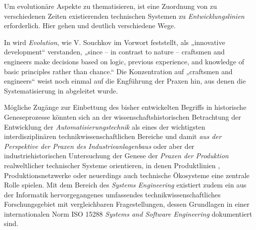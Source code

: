 \documentclass[11pt,a4paper]{article}
\begin{document}
Um evolutionäre Aspekte zu thematisieren, ist eine Zuordnung von zu
verschiedenen Zeiten existierenden technischen Systemen zu
\emph{Entwicklungslinien} erforderlich. Hier gehen \cite{Shpakovsky2010} und
\cite{TESE2018} deutlich verschiedene Wege.

In \cite{TESE2018} wird \emph{Evolution}, wie V. Souchkov im Vorwort
\cite[S. IX]{TESE2018} feststellt, als „innovative development“ verstanden,
„since -- in contrast to nature -- craftsmen and engineers make decisions
based on logic, previous experience, and knowledge of basic principles rather
than chance.“ Die Konzentration auf „craftsmen and engineers“ weist noch
einmal auf die Engführung der Praxen hin, aus denen die Systematisierung in
\cite{TESE2018} abgeleitet wurde.

Mögliche Zugänge zur Einbettung des bisher entwickelten Begriffs in
historische Geneseprozesse könnten sich an der wissenschaftshistorischen
Betrachtung \cite{Weller2008} der Entwicklung der
\emph{Automatisierungstechnik} als eines der wichtigsten interdisziplinären
technikwissenschaftlichen Bereiche und damit \emph{aus der Perspektive der
  Praxen des Industrieanlagenbaus} oder aber der industriehistorischen
Untersuchung der Genese der \emph{Praxen der Produktion} realweltlicher
technischer Systeme orientieren, in denen Produktlinien \cite{Pohl2005},
Produktionsnetzwerke \cite{Friedli2013} oder neuerdings auch technische
Ökosysteme \cite{Graebe2018} eine zentrale Rolle spielen. Mit dem Bereich des
\emph{Systems Engineering} existiert zudem ein aus der Informatik
hervorgegangenes umfassendes technikwissenschaftliches Forschungsgebiet mit
vergleichbaren Fragestellungen, dessen Grundlagen in einer internationalen
Norm ISO 15288 \emph{Systems and Software Engineering} dokumentiert sind.
\end{document}
